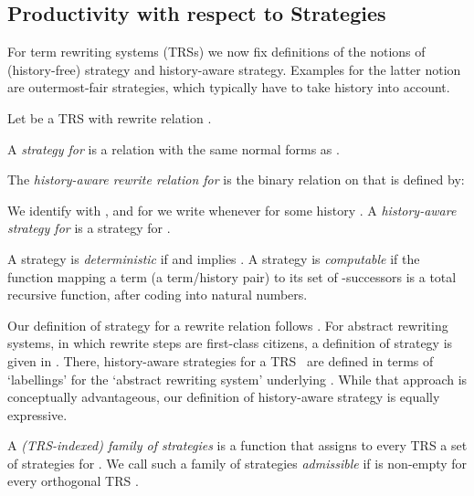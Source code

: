 \subsection{Productivity with respect to Strategies}
  \label{sec:productivity:subsec:strategies}

For term rewriting systems (TRSs) \cite{terese:2003}
we now fix definitions of the notions of 
(history-free) strategy and history-aware strategy.
Examples for the latter notion are outermost-fair strategies,
which typically have to take history into account.


\begin{definition}\normalfont
Let  be a TRS with rewrite relation .

  A \emph{strategy for } is a relation 
   with the same normal forms
  as .

  The \emph{history-aware rewrite relation  for }
  is the binary relation on  
  that is defined by:

We identify  with ,
  and for  we write  
  whenever  for some history .
A \emph{history-aware strategy for } is a strategy for
  .

  A strategy  is \emph{deterministic} if 
   and  implies . 
  A strategy  is \emph{computable} if the function mapping
  a term (a term/history pair) to its set of -successors
  is a total recursive function, after coding into natural numbers. 
\end{definition}

\begin{remark}
Our definition of strategy for a rewrite relation
  follows \cite{toya:1992}.
  For abstract rewriting systems, 
  in which rewrite steps are first-class citizens,
  a definition of strategy is given in \cite[Ch.\,9]{terese:2003}.
  There, history-aware strategies for a TRS~ are defined in terms of 
  `labellings' for the `abstract rewriting system' underlying .
  While that approach is conceptually advantageous, our definition
  of history-aware strategy is equally expressive.  
\end{remark}

\begin{definition}\normalfont
A \emph{(TRS-indexed) family of strategies } 
  is a function that assigns to every TRS  
  a set   of strategies for .
We call such a family  of strategies \emph{admissible} 
  if  
  is non-empty for every orthogonal TRS .
\end{definition}

\newcommand{\strategy}{\leadsto}


